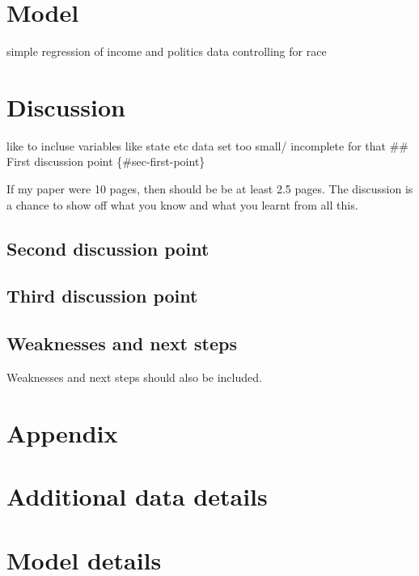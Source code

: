 \documentclass[
  letterpaper,
  DIV=11,
  numbers=noendperiod]{scrartcl}
\begin{document}
\section{Model}\label{model}

simple regression of income and politics data controlling for race

\section{Discussion}\label{discussion}

like to incluse variables like state etc data set too small/ incomplete
for that \#\# First discussion point \{\#sec-first-point\}

If my paper were 10 pages, then should be be at least 2.5 pages. The
discussion is a chance to show off what you know and what you learnt
from all this.

\subsection{Second discussion point}\label{second-discussion-point}

\subsection{Third discussion point}\label{third-discussion-point}

\subsection{Weaknesses and next steps}\label{weaknesses-and-next-steps}

Weaknesses and next steps should also be included.

\newpage

\appendix

\section*{Appendix}\label{appendix}

\section{Additional data details}\label{additional-data-details}

\section{Model details}\label{sec-model-details}
\end{document}
